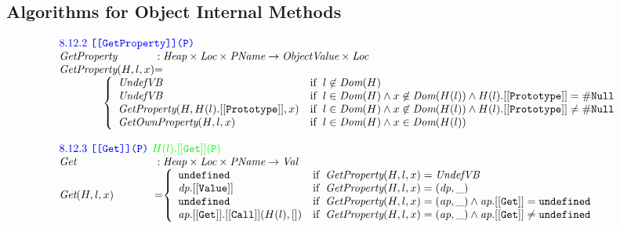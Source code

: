 \subsection*{ Algorithms for Object Internal Methods}
\[
\begin{array}{l@{}c@{}l}

\multicolumn{3}{l}{\mbox{\inblue 8.12.2 {\tt [[GetProperty]](P)}}}\\
\hf{GetProperty} & :& \Heap \times \Loc \times \Prop \rightarrow \ObjV \times \Loc \\
\hf{GetProperty}(H,l,x) &=\\
\multicolumn{3}{l}{
\rulesep\rulesep
\left\{\begin{array}{ll}
\UndefVB & \ifc{l\not\in \hf{Dom}(H)} \\
\UndefVB & \ifc{l\in\hf{Dom}(H)\wedge x\not\in\hf{Dom}(H(l)) \wedge
H(l).{\tt [[Prototype]]} = \nullL} \\
\hf{GetProperty}(H,H(l).{\tt [[Prototype]]},x) &
\ifc{l\in\hf{Dom}(H)\wedge x\not\in\hf{Dom}(H(l)) \wedge
H(l).{\tt [[Prototype]]} \not= \nullL}\\
\hf{GetOwnProperty}(H,l,x) &
\ifc{l\in\hf{Dom}(H)\wedge x\in\hf{Dom}(H(l))}
\end{array}\right.
}
\\\\

\multicolumn{3}{l}{\mbox{\inblue 8.12.3 {\tt [[Get]](P)} {\ingreen$H(l).{\tt[[Get]](P)}$}}}\\
\hf{Get} & :& \Heap \times \Loc \times \Prop \rightarrow \Val \\
\hf{Get}(H,l,x) &=&
\left\{\begin{array}{ll}
\undef & \ifc{\hf{GetProperty}(H,l,x) = \UndefVB} \\
\emph{dp}.{\tt[[Value]]} & \ifc{\hf{GetProperty}(H,l,x) = (\emph{dp}, \_)} \\
\undef & \ifc{\hf{GetProperty}(H,l,x) = (\emph{ap}, \_) \wedge
\emph{ap}.{\tt[[Get]]} = \undef} \\
\emph{ap}.{\tt[[Get]]}.{\tt[[Call]]}(H(l),[])
 & \ifc{\hf{GetProperty}(H,l,x) = (\emph{ap}, \_) \wedge
\emph{ap}.{\tt[[Get]]} \not= \undef} \\
\end{array}\right.
\\\\


\end{array}\]

